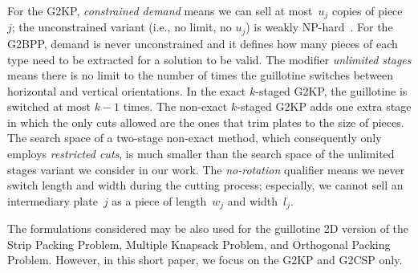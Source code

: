 \documentclass[9pt]{entcs}
\begin{document}
For the G2KP, \emph{constrained demand} means we can sell at most~\(u_j\) copies of piece~\(j\); the unconstrained variant (i.e., no limit, no \(u_j\)) is weakly NP-hard~\cite{beasley:1985:guillotine}. %
For the G2BPP, demand is never unconstrained and it defines how many pieces of each type need to be extracted for a solution to be valid.
The modifier \emph{unlimited stages} means there is no limit to the number of times the guillotine switches between horizontal and vertical orientations.
In the exact \(k\)-staged G2KP, the guillotine is switched at most \(k-1\) times. %
The non-exact \(k\)-staged G2KP adds one extra stage in which the only cuts allowed are the ones that trim plates to the size of pieces.
The search space of a two-stage non-exact method, which consequently only employs \emph{restricted cuts}, is much smaller than the search space of the unlimited stages variant we consider in our work.
The \emph{no-rotation} qualifier means we never switch length and width during the cutting process; especially, we cannot sell an intermediary plate~\(j\) as a piece of length~\(w_j\) and width~\(l_j\).


The formulations considered may be also used for the guillotine 2D version of the Strip Packing Problem, Multiple Knapsack Problem, and Orthogonal Packing Problem.
However, in this short paper, we focus on the G2KP and G2CSP only.
\end{document}
